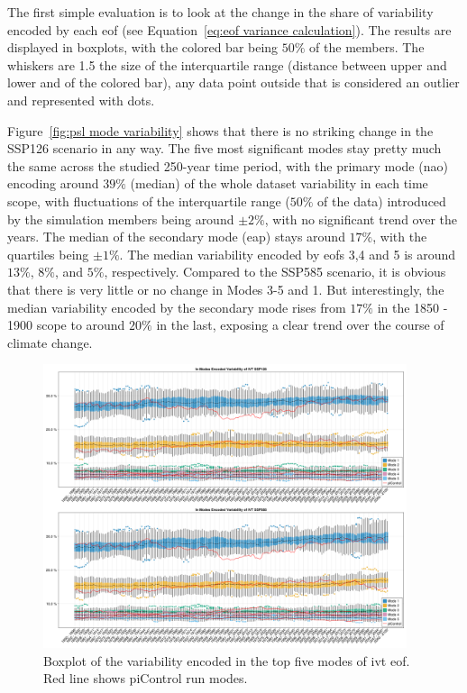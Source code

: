 The first simple evaluation is to look at the change in the share of variability encoded by each \ac{eof} (see Equation~\ref{eq:eof variance calculation}). 
The results are displayed in boxplots, with the colored bar being $50\%$  of the members. 
The whiskers are 1.5 the size of the interquartile range (distance between upper and lower and of the colored bar), any data point outside that is considered an outlier and represented with dots. 


Figure~\ref{fig:psl mode variability} shows that there is no striking change in the SSP126 scenario in any way. 
The five most significant modes stay pretty much the same across the studied 250-year time period, with the primary mode (\ac{nao}) encoding around $39\%$ (median) of the whole dataset variability in each time scope, with fluctuations of the interquartile range ($50\%$ of the data) introduced by the simulation members being around $\pm 2\%$, with no significant trend over the years. 
The median of the secondary mode (\ac{eap}) stays around $17\%$, with the quartiles being $\pm 1\%$. 
The median variability encoded by \acp{eof} 3,4 and 5 is around $13\%$, $8\%$, and $5\%$, respectively. 
Compared to the SSP585 scenario, it is obvious that there is very little or no change in Modes 3-5 and 1. 
But interestingly, the median variability encoded by the secondary mode rises from $17\%$ in the 1850 - 1900 scope to around $20\%$ in the last, exposing a clear trend over the course of climate change.   


\begin{figure}[hbt]
  \begin{center}
    \includegraphics[width=0.95\textwidth]{figures/mode_variability_ivt_50seasons.png}
  \end{center}
  \caption[Explained Variability of IVT Modes]{Boxplot of the variability encoded in the top five modes of \ac{ivt} \ac{eof}. Red line shows piControl run modes.}
  \label{fig:ivt mode variability}
\end{figure}

